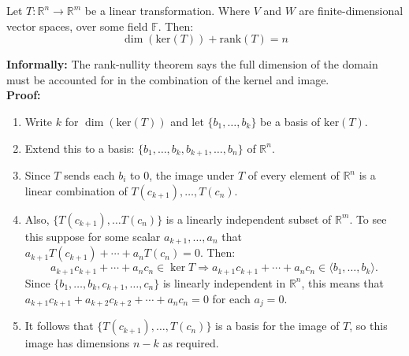 \documentclass[a4paper, 9pt]{extarticle}
\begin{document}
\begin{theorembox}{}{}
  Let $T: \mathbb{R}^n \to \mathbb{R}^m$ be a linear transformation. Where $V$ and $W$ are finite-dimensional vector spaces, over some field $\mathbb{F}$. Then:
  $$
    \dim(\text{ker}(T)) + \text{rank}(T) = n
  $$
\end{theorembox}
\noindent\textbf{Informally:}  The rank-nullity theorem says the full dimension of the domain must be accounted for in the combination of the kernel and image.\\[2ex]
\noindent\textbf{Proof:}
\begin{enumerate}
  \item Write $k$ for $\dim(\text{ker}(T))$ and let $\{b_1, \dots, b_k\}$ be a basis of $\text{ker}(T)$.
  \item Extend this to a basis: $\{b_1, \dots, b_k, b_{k+1}, \dots, b_n\}$ of $\mathbb{R}^n$.
  \item Since $T$ sends each $b_i$ to $0$, the image under $T$ of every element of $\mathbb{R}^n$ is a linear combination of $T(c_{k+1}), \dots, T(c_n)$.
  \item Also, $\{T(c_{k+1}), \dots T(c_n) \}$ is a linearly independent subset of $\mathbb{R}^m$. To see this suppose for some scalar $a_{k+1}, \dots, a_n$ that $a_{k+1}T(c_{k+1}) + \cdots + a_nT(c_n) = 0$. Then:
        $$
          a_{k+1}c_{k+1}+\cdots+a_nc_n\in\ker T\Longrightarrow a_{k+1}c_{k+1}+\cdots+a_nc_n\in\langle b_1,\ldots,b_k\rangle.
        $$
        Since $\{b_1, \dots, b_k, c_{k+1}, \dots, c_n\}$ is linearly independent in $\mathbb{R}^n$, this means that $a_{k+1}c_{k+1} + a_{k+2}c_{k+2} + \cdots + a_nc_n = 0$ for each $a_j = 0$.
  \item It follows that $\{T(c_{k+1}), \dots, T(c_n)\}$ is a basis for the image of $T$, so this image has dimensions $n-k$ as required.
\end{enumerate}
\end{document}
